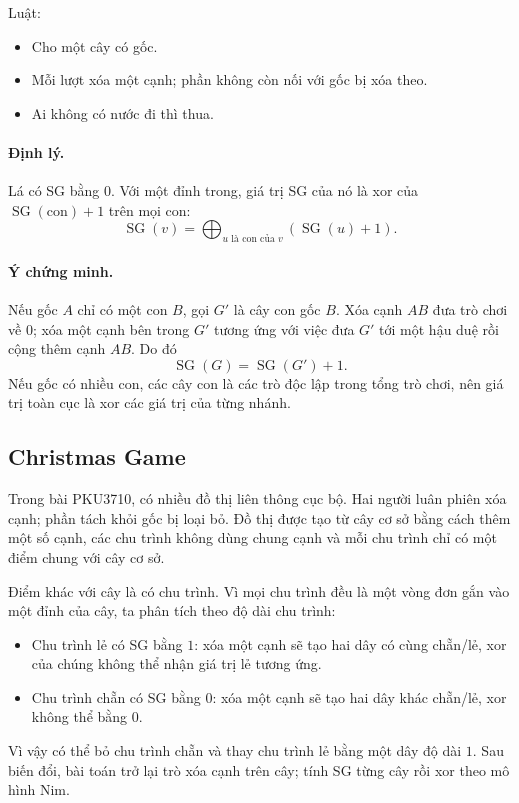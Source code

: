 \documentclass[11pt]{article}
\newcommand{\SG}{\operatorname{SG}}
\newcommand{\bigxor}{\bigoplus}
\begin{document}
Luật:
\begin{itemize}
  \item Cho một cây có gốc.
  \item Mỗi lượt xóa một cạnh; phần không còn nối với gốc bị xóa theo.
  \item Ai không có nước đi thì thua.
\end{itemize}

\paragraph{Định lý.}
Lá có SG bằng \(0\). Với một đỉnh trong, giá trị SG của nó là xor của
\(\SG(\text{con})+1\) trên mọi con:
\[
  \SG(v)=\bigxor_{u\text{ là con của }v}(\SG(u)+1).
\]

\paragraph{Ý chứng minh.}
Nếu gốc \(A\) chỉ có một con \(B\), gọi \(G'\) là cây con gốc \(B\). Xóa cạnh
\(AB\) đưa trò chơi về \(0\); xóa một cạnh bên trong \(G'\) tương ứng với việc
đưa \(G'\) tới một hậu duệ rồi cộng thêm cạnh \(AB\). Do đó
\[
  \SG(G)=\SG(G')+1.
\]
Nếu gốc có nhiều con, các cây con là các trò độc lập trong tổng trò chơi, nên
giá trị toàn cục là xor các giá trị của từng nhánh.

\subsection{Christmas Game}

Trong bài PKU3710, có nhiều đồ thị liên thông cục bộ. Hai người luân phiên
xóa cạnh; phần tách khỏi gốc bị loại bỏ. Đồ thị được tạo từ cây cơ sở bằng
cách thêm một số cạnh, các chu trình không dùng chung cạnh và mỗi chu trình
chỉ có một điểm chung với cây cơ sở.

Điểm khác với cây là có chu trình. Vì mọi chu trình đều là một vòng đơn gắn
vào một đỉnh của cây, ta phân tích theo độ dài chu trình:
\begin{itemize}
  \item Chu trình lẻ có SG bằng \(1\): xóa một cạnh sẽ tạo hai dây có cùng
  chẵn/lẻ, xor của chúng không thể nhận giá trị lẻ tương ứng.
  \item Chu trình chẵn có SG bằng \(0\): xóa một cạnh sẽ tạo hai dây khác
  chẵn/lẻ, xor không thể bằng \(0\).
\end{itemize}
Vì vậy có thể bỏ chu trình chẵn và thay chu trình lẻ bằng một dây độ dài \(1\).
Sau biến đổi, bài toán trở lại trò xóa cạnh trên cây; tính SG từng cây rồi xor
theo mô hình Nim.
\end{document}
